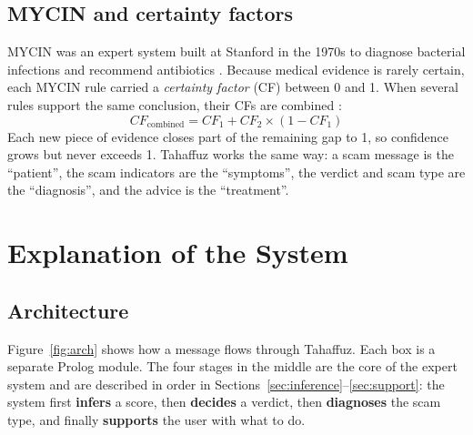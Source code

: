 \documentclass[11pt,a4paper]{article}
\begin{document}
\subsection{MYCIN and certainty factors}
MYCIN was an expert system built at Stanford in the 1970s to diagnose bacterial infections and
recommend antibiotics \cite{buchanan1984}. Because medical evidence is rarely certain, each MYCIN
rule carried a \emph{certainty factor} (CF) between 0 and 1. When several rules support the same
conclusion, their CFs are combined \cite{shortliffe1975}:
\begin{equation}
  CF_{\text{combined}} = CF_1 + CF_2 \times (1 - CF_1)
  \label{eq:mycin}
\end{equation}
Each new piece of evidence closes part of the remaining gap to 1, so confidence grows but never
exceeds 1. Tahaffuz works the same way: a scam message is the ``patient'', the scam indicators are the
``symptoms'', the verdict and scam type are the ``diagnosis'', and the advice is the ``treatment''.

\section{Explanation of the System}

\subsection{Architecture}
Figure~\ref{fig:arch} shows how a message flows through Tahaffuz. Each box is a separate Prolog module.
The four stages in the middle are the core of the expert system and are described in order in
Sections~\ref{sec:inference}--\ref{sec:support}: the system first \textbf{infers} a score, then
\textbf{decides} a verdict, then \textbf{diagnoses} the scam type, and finally \textbf{supports}
the user with what to do.
\end{document}

